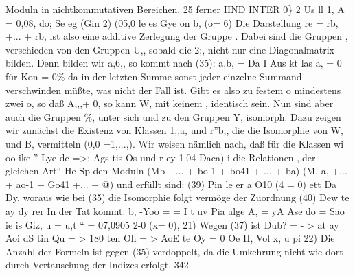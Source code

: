 \documentclass[11pt,a4paper]{article}
\theoremstyle{plain}
\theoremstyle{definition}
\begin{document}
Moduln in nichtkommutativen Bereichen. 
25 
ferner IIND INTER 0\} 
2 
Us ll 
1, 
A 
= 0,08, do; Se eg 
(Gin 2) 
(05,0 
le es Gye 
on 
b, (o= 6) 
Die Darstellung re = rb, +... + rb, ist also eine additive Zerlegung 
der Gruppe . Dabei sind die Gruppen , verschieden von den Gruppen 
U,, sobald die 2;, nicht nur 
eine Diagonalmatrix 
bilden. 
Denn 
bilden 
wir a,6,, so kommt nach (35): 
a,b, = Da 
I Aus 
kt 
las a, = 0 
für 
Kon = 0\% 
da in der letzten Summe 
sonst 
jeder einzelne Summand verschwinden 
müßte, was nicht der Fall ist. 
Gibt es also zu festem o mindestens zwei 
o, so daß A,,,+ 0, so kann W, mit keinem , identisch sein. 
Nun sind aber auch die Gruppen \%, unter sich und zu den Gruppen 
Y, isomorph. 
Dazu zeigen wir zunächst die Existenz von Klassen 1,,a, 
und r''\textdegree{}b,, die die Isomorphie von W, und B, vermitteln (0,0 =1,...,\guillemotleft{}). 
Wir weisen nämlich nach, daß für die Klassen 
wi 
oo 
ike 
'' 
Lye de =>; Ags tis Os 
und 
r ey 1.04 
Daca) 
i 
die Relationen ,,der gleichen Art`` He Sp den Moduln 
(Mb +... 
+ bo-1 + bo41 + ... 
+ ba) 
(M, a, +... 
+ ao-1 + Go41 +... + @) 
und 
erfüllt sind: 
(39) 
Pin 
le er 
a 
O10 
(4 = 0) 
ett Da Dy, 
woraus wie bei (35) die Isomorphie folgt vermöge der Zuordnung 
(40) 
Dew te ay 
dy rer 
In der Tat kommt: 
b, 
-Yoo = = I 
t uv 
Pia alge A, = 
yA Ase do = Sao ie is Giz, 
u = 
u,t 
`` 
= 07,0905 2-0 
(x= 0), 
21) Wegen (37) ist 
Dub? = 
- 
> at ay Aoi dS  tin Qu = > 180 
ten Oh = > 
AoE te Oy = 0 Oe 
H, Vol 
x, u 
pi 
22) Die Anzahl der Formeln ist gegen (35) verdoppelt, da die Umkehrung nicht 
wie dort durch Vertauschung der Indizes erfolgt. 
342
\end{document}
